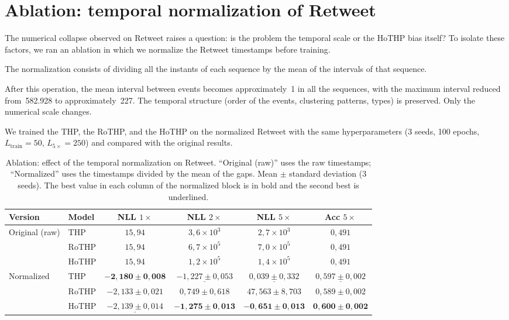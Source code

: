 \section{Ablation: temporal normalization of Retweet}
\label{sec:ablacao-retweet}

The numerical collapse observed on Retweet raises a question: is the problem the temporal scale or the HoTHP bias itself? To isolate these factors, we ran an ablation in which we normalize the Retweet timestamps before training.

The normalization consists of dividing all the instants of each sequence by the mean of the intervals of that sequence.

After this operation, the mean interval between events becomes approximately~1 in all the sequences, with the maximum interval reduced from~582.928 to approximately~227. The temporal structure (order of the events, clustering patterns, types) is preserved. Only the numerical scale changes.

We trained the THP, the RoTHP, and the HoTHP on the normalized Retweet with the same hyperparameters (3 seeds, 100 epochs, $L_{\text{train}} = 50$, $L_{5\times} = 250$) and compared with the original results.

\begin{table}[h!]
\centering
\caption{Ablation: effect of the temporal normalization on Retweet. ``Original (raw)'' uses the raw timestamps; ``Normalized'' uses the timestamps divided by the mean of the gaps. Mean $\pm$ standard deviation (3 seeds). The best value in each column of the normalized block is in bold and the second best is underlined.}
\label{tab:ablacao-retweet}
\begin{tabular}{llcccc}
\toprule
Version & Model & NLL $1\times$ & NLL $2\times$ & NLL $5\times$ & Acc $5\times$ \\
\midrule
\multirow{3}{*}{Original (raw)}
    & THP    & $15{,}94$ & $3{,}6 \times 10^{3}$ & $2{,}7 \times 10^{3}$ & $0{,}491$ \\
    & RoTHP  & $15{,}94$ & $6{,}7 \times 10^{5}$ & $7{,}0 \times 10^{5}$ & $0{,}491$ \\
    & HoTHP  & $15{,}94$ & $1{,}2 \times 10^{5}$ & $1{,}4 \times 10^{5}$ & $0{,}491$ \\
\midrule
\multirow{3}{*}{Normalized}
    & THP    & $\mathbf{-2{,}180 \pm 0{,}008}$ & $\underline{-1{,}227 \pm 0{,}053}$ & $\underline{0{,}039 \pm 0{,}332}$ & $\underline{0{,}597 \pm 0{,}002}$ \\
    & RoTHP  & $-2{,}133 \pm 0{,}021$ & $0{,}749 \pm 0{,}618$ & $47{,}563 \pm 8{,}703$ & $0{,}589 \pm 0{,}002$ \\
    & HoTHP  & $\underline{-2{,}139 \pm 0{,}014}$ & $\mathbf{-1{,}275 \pm 0{,}013}$ & $\mathbf{-0{,}651 \pm 0{,}013}$ & $\mathbf{0{,}600 \pm 0{,}002}$ \\
\bottomrule
\end{tabular}
\end{table}


